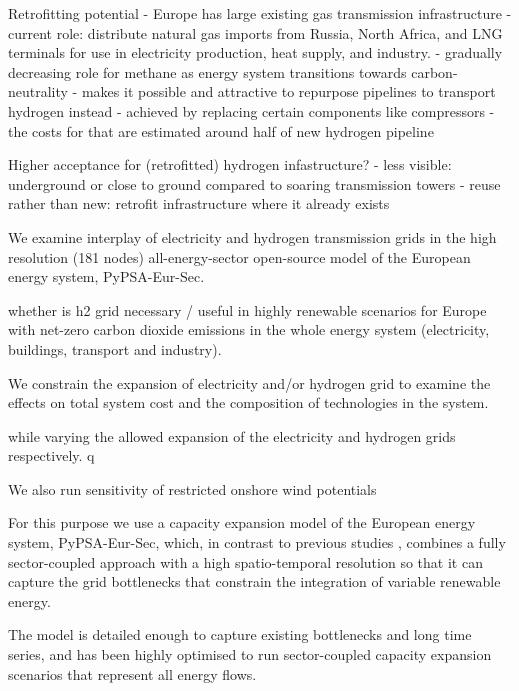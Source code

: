 Retrofitting potential
- Europe has large existing gas transmission infrastructure
- current role: distribute natural gas imports from Russia, North Africa, and LNG terminals for use in electricity production, heat supply, and industry.
- gradually decreasing role for methane as energy system transitions towards carbon-neutrality
- makes it possible and attractive to repurpose pipelines to transport hydrogen instead
- achieved by replacing certain components like compressors
- the costs for that are estimated around half of new hydrogen pipeline

Higher acceptance for (retrofitted) hydrogen infastructure?
- less visible: underground or close to ground compared to soaring transmission towers
- reuse rather than new: retrofit infrastructure where it already exists


We examine interplay of electricity and hydrogen transmission grids in the high
resolution (181 nodes) all-energy-sector open-source model of the European
energy system, PyPSA-Eur-Sec.

whether is h2 grid necessary / useful in highly
renewable scenarios for Europe with net-zero carbon dioxide emissions
in the whole energy system (electricity, buildings, transport and
industry).

We constrain the expansion of electricity and/or hydrogen grid to examine the
effects on total system cost and the composition of technologies in the system.

while
varying the allowed expansion of the electricity and hydrogen grids
respectively. q

We also run sensitivity of restricted onshore wind potentials


For this purpose we use a capacity expansion model of the European energy
system, PyPSA-Eur-Sec, which, in contrast to previous studies
\cite{henningComprehensiveModel2014,mathiesenSmartEnergy2015,IEESWV,connollySmartEnergy2016,lofflerDesigningModel2017,blancoPotentialHydrogen2018,brownSynergiesSector2018,in-depth_2018,victoria2020},
combines a fully sector-coupled approach with a high spatio-temporal resolution
so that it can capture the grid bottlenecks that constrain the integration of
variable renewable energy.

The model is detailed enough to capture existing
bottlenecks and long time series, and has been highly optimised to run
sector-coupled capacity expansion scenarios that represent all energy flows.

